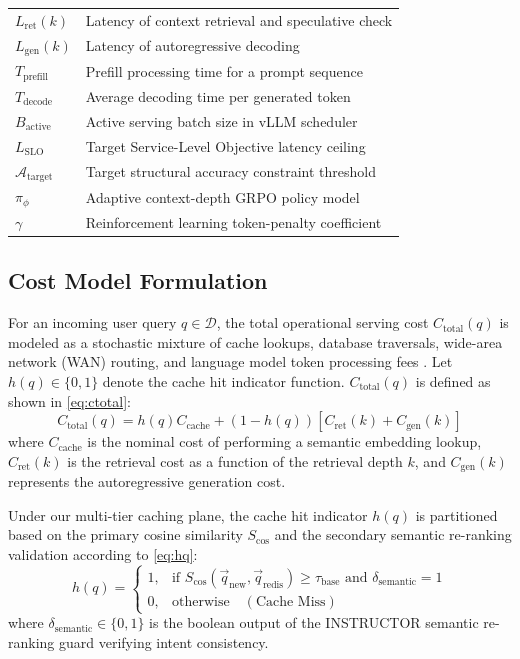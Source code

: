 \documentclass{ieeeaccess}
\begin{document}
\begin{table}[!t]
\begin{tabular}{ll}
$L_{\text{ret}}(k)$ & Latency of context retrieval and speculative check \\
$L_{\text{gen}}(k)$ & Latency of autoregressive decoding \\
$T_{\text{prefill}}$ & Prefill processing time for a prompt sequence \\
$T_{\text{decode}}$ & Average decoding time per generated token \\
$B_{\text{active}}$ & Active serving batch size in vLLM scheduler \\
$L_{\text{SLO}}$ & Target Service-Level Objective latency ceiling \\
$\mathcal{A}_{\text{target}}$ & Target structural accuracy constraint threshold \\
$\pi_{\phi}$ & Adaptive context-depth GRPO policy model \\
$\gamma$ & Reinforcement learning token-penalty coefficient \\
\bottomrule
\end{tabular}
\label{tab:nomenclature}
\end{table}

\subsection{Cost Model Formulation}
For an incoming user query $q \in \mathcal{D}$, the total operational serving cost $C_{\text{total}}(q)$ is modeled as a stochastic mixture of cache lookups, database traversals, wide-area network (WAN) routing, and language model token processing fees \cite{hashemi-cost-aware-2025, ruan-asteria-2025, singh-krites-2026}. Let $h(q) \in \{0, 1\}$ denote the cache hit indicator function. $C_{\text{total}}(q)$ is defined as shown in \eqref{eq:ctotal}:
\begin{equation}
\label{eq:ctotal}
    C_{\text{total}}(q) = h(q) C_{\text{cache}} + (1 - h(q)) \left[ C_{\text{ret}}(k) + C_{\text{gen}}(k) \right]
\end{equation}
where $C_{\text{cache}}$ is the nominal cost of performing a semantic embedding lookup, $C_{\text{ret}}(k)$ is the retrieval cost as a function of the retrieval depth $k$, and $C_{\text{gen}}(k)$ represents the autoregressive generation cost.

Under our multi-tier caching plane, the cache hit indicator $h(q)$ is partitioned based on the primary cosine similarity $S_{\text{cos}}$ and the secondary semantic re-ranking validation \cite{reimers-sbert-2019} according to \eqref{eq:hq}:
\begin{equation}
\label{eq:hq}
    h(q) = 
    \begin{cases} 
      1, & \text{if } S_{\text{cos}}(\vec{q}_{\text{new}}, \vec{q}_{\text{redis}}) \ge \tau_{\text{base}} \text{ and } \delta_{\text{semantic}} = 1 \\
      0, & \text{otherwise} \quad (\text{Cache Miss})
    \end{cases}
\end{equation}
where $\delta_{\text{semantic}} \in \{0, 1\}$ is the boolean output of the INSTRUCTOR semantic re-ranking guard verifying intent consistency.
\end{document}
